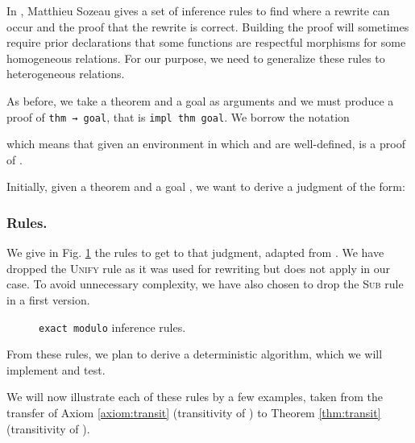 \documentclass{llncs}
\begin{document}
In \cite{Sozeau2010}, Matthieu Sozeau
gives a set of inference rules to find where a rewrite can
occur and the proof that the rewrite is correct. Building the
proof will sometimes require prior declarations that
some functions are respectful morphisms for
some homogeneous relations.
For our purpose, we need to generalize these rules to
heterogeneous relations.

As before, we take a theorem and a goal
as arguments and we must produce a proof of \texttt{thm → goal}, that is
\texttt{impl thm goal}.
We borrow the notation

which means that given an environment 
in which  and  are well-defined,
 is a proof of .

Initially, given a theorem  and a goal
, we want to derive a judgment of the form:


\subsubsection{Rules.}

We give in Fig. \ref{fig:rules}
the rules to get to that judgment, adapted from \cite{Sozeau2010}. We have dropped
the \textsc{Unify} rule as it was used for rewriting but does not
apply in our case. To avoid unnecessary complexity,
we have also chosen to drop the \textsc{Sub} rule in a first version.

\begin{figure}
    
    
    
    
    
    \caption{\texttt{exact modulo} inference rules.}
    \label{fig:rules}
\end{figure}

From these rules, we plan to derive a deterministic algorithm,
which we will implement and test.

We will now illustrate each of these rules by a few examples,
taken from the transfer of Axiom \ref{axiom:transit}
(transitivity of )
to Theorem \ref{thm:transit} (transitivity of ).
\end{document}
